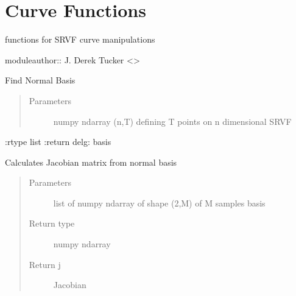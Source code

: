 \documentclass[letterpaper,10pt,english]{sphinxmanual}
\begin{document}
\chapter{Curve Functions}
\label{\detokenize{curve_functions:module-curve_functions}}\label{\detokenize{curve_functions:curve-functions}}\label{\detokenize{curve_functions::doc}}
functions for SRVF curve manipulations

moduleauthor:: J. Derek Tucker \textless{}\textgreater{}

\begin{fulllineitems}
\label{\detokenize{curve_functions:curve_functions.Basis_Normal_A}}
Find Normal Basis
\begin{quote}\begin{description}
\item[{Parameters}] \leavevmode
{} \textendash{} numpy ndarray (n,T) defining T points on n dimensional SRVF

\end{description}\end{quote}

:rtype list
:return delg: basis

\end{fulllineitems}


\begin{fulllineitems}
\label{\detokenize{curve_functions:curve_functions.calc_j}}
Calculates Jacobian matrix from normal basis
\begin{quote}\begin{description}
\item[{Parameters}] \leavevmode
{} \textendash{} list of numpy ndarray of shape (2,M) of M samples basis

\item[{Return type}] \leavevmode
numpy ndarray

\item[{Return j}] \leavevmode
Jacobian

\end{description}\end{quote}

\end{fulllineitems}
\end{document}

